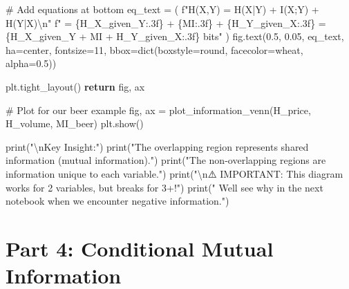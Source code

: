\documentclass[
  11pt,
  letterpaper,
  oneside,
  openany]{book}
\newenvironment{Shaded}{\begin{snugshade}}{\end{snugshade}}
\newcommand{\BuiltInTok}[1]{\textcolor[rgb]{0.00,0.23,0.31}{#1}}
\newcommand{\CharTok}[1]{\textcolor[rgb]{0.13,0.47,0.30}{#1}}
\newcommand{\CommentTok}[1]{\textcolor[rgb]{0.37,0.37,0.37}{#1}}
\newcommand{\ControlFlowTok}[1]{\textcolor[rgb]{0.00,0.23,0.31}{\textbf{#1}}}
\newcommand{\DecValTok}[1]{\textcolor[rgb]{0.68,0.00,0.00}{#1}}
\newcommand{\FloatTok}[1]{\textcolor[rgb]{0.68,0.00,0.00}{#1}}
\newcommand{\NormalTok}[1]{\textcolor[rgb]{0.00,0.23,0.31}{#1}}
\newcommand{\OperatorTok}[1]{\textcolor[rgb]{0.37,0.37,0.37}{#1}}
\newcommand{\SpecialCharTok}[1]{\textcolor[rgb]{0.37,0.37,0.37}{#1}}
\newcommand{\SpecialStringTok}[1]{\textcolor[rgb]{0.13,0.47,0.30}{#1}}
\newcommand{\StringTok}[1]{\textcolor[rgb]{0.13,0.47,0.30}{#1}}
\begin{document}
\begin{Shaded}
\begin{Highlighting}[]
    \CommentTok{\# Add equations at bottom}
\NormalTok{    eq\_text }\OperatorTok{=}\NormalTok{ (}
        \SpecialStringTok{f"H(X,Y) = H(X|Y) + I(X;Y) + H(Y|X)}\CharTok{\textbackslash{}n}\SpecialStringTok{"}
        \SpecialStringTok{f"       = }\SpecialCharTok{\{}\NormalTok{H\_X\_given\_Y}\SpecialCharTok{:.3f\}}\SpecialStringTok{ + }\SpecialCharTok{\{}\NormalTok{MI}\SpecialCharTok{:.3f\}}\SpecialStringTok{ + }\SpecialCharTok{\{}\NormalTok{H\_Y\_given\_X}\SpecialCharTok{:.3f\}}\SpecialStringTok{ = }\SpecialCharTok{\{}\NormalTok{H\_X\_given\_Y }\OperatorTok{+}\NormalTok{ MI }\OperatorTok{+}\NormalTok{ H\_Y\_given\_X}\SpecialCharTok{:.3f\}}\SpecialStringTok{ bits"}
\NormalTok{    )}
\NormalTok{    fig.text(}\FloatTok{0.5}\NormalTok{, }\FloatTok{0.05}\NormalTok{, eq\_text, ha}\OperatorTok{=}\StringTok{\textquotesingle{}center\textquotesingle{}}\NormalTok{, fontsize}\OperatorTok{=}\DecValTok{11}\NormalTok{,}
\NormalTok{             bbox}\OperatorTok{=}\BuiltInTok{dict}\NormalTok{(boxstyle}\OperatorTok{=}\StringTok{\textquotesingle{}round\textquotesingle{}}\NormalTok{, facecolor}\OperatorTok{=}\StringTok{\textquotesingle{}wheat\textquotesingle{}}\NormalTok{, alpha}\OperatorTok{=}\FloatTok{0.5}\NormalTok{))}
    
\NormalTok{    plt.tight\_layout()}
    \ControlFlowTok{return}\NormalTok{ fig, ax}

\CommentTok{\# Plot for our beer example}
\NormalTok{fig, ax }\OperatorTok{=}\NormalTok{ plot\_information\_venn(H\_price, H\_volume, MI\_beer)}
\NormalTok{plt.show()}

\BuiltInTok{print}\NormalTok{(}\StringTok{"}\CharTok{\textbackslash{}n}\StringTok{Key Insight:"}\NormalTok{)}
\BuiltInTok{print}\NormalTok{(}\StringTok{"The overlapping region represents shared information (mutual information)."}\NormalTok{)}
\BuiltInTok{print}\NormalTok{(}\StringTok{"The non{-}overlapping regions are information unique to each variable."}\NormalTok{)}
\BuiltInTok{print}\NormalTok{(}\StringTok{"}\CharTok{\textbackslash{}n}\StringTok{⚠️  IMPORTANT: This diagram works for 2 variables, but breaks for 3+!"}\NormalTok{)}
\BuiltInTok{print}\NormalTok{(}\StringTok{"    We\textquotesingle{}ll see why in the next notebook when we encounter negative information."}\NormalTok{)}
\end{Highlighting}
\end{Shaded}

\section{Part 4: Conditional Mutual
Information}\label{part-4-conditional-mutual-information}
\end{document}

